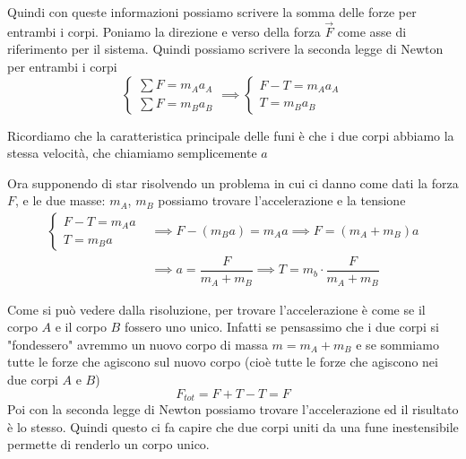 \documentclass{rapport}
\begin{document}
Quindi con queste informazioni possiamo scrivere la somma delle forze per entrambi i corpi. Poniamo la direzione e verso della forza $\vec{F}$ come asse di riferimento per il sistema. Quindi possiamo scrivere la seconda legge di Newton per entrambi i corpi
\[
\begin{cases}
  \sum F = m_Aa_A\\
  \sum F = m_Ba_B
\end{cases}\implies\begin{cases}
F - T= m_A a_A \\
  T = m_B a_B 
\end{cases}
\]

Ricordiamo che la caratteristica principale delle funi è che i due corpi abbiamo la stessa velocità, che chiamiamo semplicemente $a$

Ora supponendo di star risolvendo un problema in cui ci danno come dati la forza $F$, e le due masse: $m_A$, $m_B$ possiamo trovare l'accelerazione e la tensione 
\begin{align*}
  \begin{cases}
F- T = m_A a \\
  T = m_B a 
\end{cases} &\implies F - (m_B a) =  m_A a  \implies F = (m_A+m_B)a \\
&\implies a=\dfrac{F}{m_A+m_B} \implies T = m_b \cdot \dfrac{F}{m_A+m_B}
\end{align*}

Come si può vedere dalla risoluzione, per trovare l'accelerazione è come se il corpo $A$ e il corpo $B$ fossero uno unico. Infatti se pensassimo che i due corpi si "fondessero" avremmo un nuovo corpo di massa $m = m_A+m_B$ e se sommiamo tutte le forze che agiscono sul nuovo corpo (cioè tutte le forze che agiscono nei due corpi $A$ e $B$)
\[
F_{tot} = F + T - T = F
\]
Poi con la seconda legge di Newton possiamo trovare l'accelerazione ed il risultato è lo stesso. Quindi questo ci fa capire che due corpi uniti da una fune inestensibile permette di renderlo un corpo unico.
 
\end{document}
